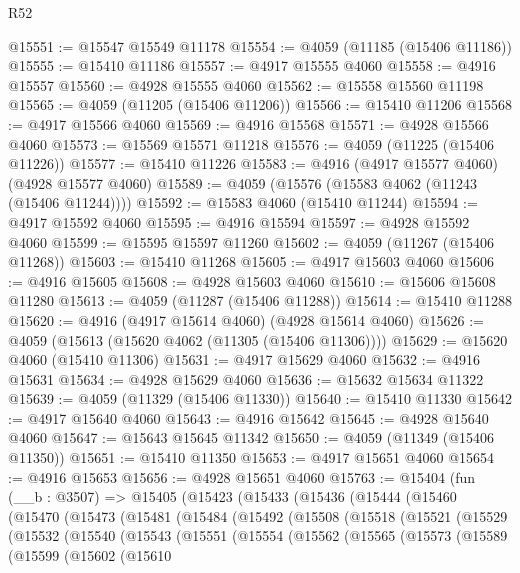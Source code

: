 \begin{lexlean}{R52}
\begin{coremodule}
@15551 := @15547 @15549 @11178
@15554 := @4059 (@11185 (@15406 @11186))
@15555 := @15410 @11186
@15557 := @4917 @15555 @4060
@15558 := @4916 @15557
@15560 := @4928 @15555 @4060
@15562 := @15558 @15560 @11198
@15565 := @4059 (@11205 (@15406 @11206))
@15566 := @15410 @11206
@15568 := @4917 @15566 @4060
@15569 := @4916 @15568
@15571 := @4928 @15566 @4060
@15573 := @15569 @15571 @11218
@15576 := @4059 (@11225 (@15406 @11226))
@15577 := @15410 @11226
@15583 := @4916 (@4917 @15577 @4060) (@4928 @15577 @4060)
@15589 := @4059 (@15576 (@15583 @4062 (@11243 (@15406 @11244))))
@15592 := @15583 @4060 (@15410 @11244)
@15594 := @4917 @15592 @4060
@15595 := @4916 @15594
@15597 := @4928 @15592 @4060
@15599 := @15595 @15597 @11260
@15602 := @4059 (@11267 (@15406 @11268))
@15603 := @15410 @11268
@15605 := @4917 @15603 @4060
@15606 := @4916 @15605
@15608 := @4928 @15603 @4060
@15610 := @15606 @15608 @11280
@15613 := @4059 (@11287 (@15406 @11288))
@15614 := @15410 @11288
@15620 := @4916 (@4917 @15614 @4060) (@4928 @15614 @4060)
@15626 := @4059 (@15613 (@15620 @4062 (@11305 (@15406 @11306))))
@15629 := @15620 @4060 (@15410 @11306)
@15631 := @4917 @15629 @4060
@15632 := @4916 @15631
@15634 := @4928 @15629 @4060
@15636 := @15632 @15634 @11322
@15639 := @4059 (@11329 (@15406 @11330))
@15640 := @15410 @11330
@15642 := @4917 @15640 @4060
@15643 := @4916 @15642
@15645 := @4928 @15640 @4060
@15647 := @15643 @15645 @11342
@15650 := @4059 (@11349 (@15406 @11350))
@15651 := @15410 @11350
@15653 := @4917 @15651 @4060
@15654 := @4916 @15653
@15656 := @4928 @15651 @4060
@15763 := @15404
    (fun (__b : @3507) =>
    @15405
      (@15423
        (@15433
          (@15436
            (@15444
              (@15460
                (@15470
                  (@15473
                    (@15481
                      (@15484
                        (@15492
                          (@15508
                            (@15518
                              (@15521
                                (@15529
                                  (@15532
                                    (@15540
                                      (@15543
                                        (@15551
                                          (@15554
                                            (@15562
                                              (@15565
                                                (@15573
                                                  (@15589
                                                    (@15599
                                                      (@15602
                                                        (@15610

\end{coremodule}
\end{lexlean}
